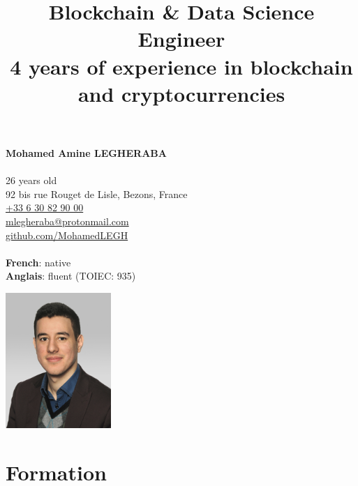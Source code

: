 \documentclass[10pt]{article}
\title{\bfseries{\Huge{Blockchain \& Data Science Engineer}}\\[0.75cm] \Large{4 years of experience in blockchain and cryptocurrencies} }
\author{\bfseries\Huge \vspace{-4ex}}
\date{}
\begin{document}
\begin{minipage}[t]{0.80\textwidth}
\textbf{Mohamed Amine LEGHERABA}\\
\vspace{1ex}\\
26 years old\\
92 bis rue Rouget de Lisle, Bezons, France\\
\href{tel:+33630829000}{+33 6 30 82 90 00}\\
\href{mailto:mlegheraba@protonmail.com}{mlegheraba@protonmail.com}\\
\href{https://github.com/MohamedLEGH}{github.com/MohamedLEGH}\\
\vspace{1ex}\\
{\bf French}: native\\
{\bf Anglais}: fluent (TOIEC: 935)\\
\end{minipage}
\begin{minipage}[t]{0.20\textwidth}
\vspace{-3ex}
\includegraphics[width=4cm]{figures/Legheraba-Mohamed.jpg}
\end{minipage}
{\let\newpage\relax\maketitle}
\thispagestyle{empty}

\vspace{-10ex}

\section*{Formation}

\vspace{2ex}
\end{document}
